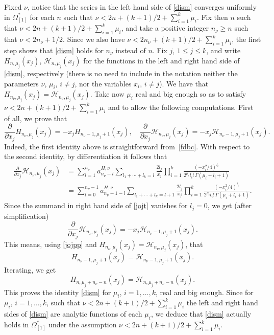 \documentclass[12pt,leqno]{amsart}
\numberwithin{equation}{section}
\theoremstyle{plain}
\newcommand{\Hh}{\mathcal{H}}
\begin{document}
Fixed $\nu$, notice that the series in the left hand side of \eqref{dism} converges uniformly in $\Omega^*_{[1]}$ for each $n$ such that $\nu<2n+(k+1)/2+ \sum_{i=1}^k\mu_i$. Fix then $n$ such that $\nu<2n+(k+1)/2+ \sum_{i=1}^k\mu_i$, and take a positive integer $n_\nu\ge n$ such that $\nu<2n_\nu+1/2$. Since we also have $\nu<2n_\nu+(k+1)/2+ \sum_{i=1}^k\mu_i$, the first step shows that \eqref{dism} holds for $n_\nu$ instead of $n$.
Fix $j$, $1\le j\le k$, and write $H_{n,\mu_j}(x_j)$, $\Hh_{n,\mu_j}(x_j)$ for the functions in the left and right hand side of \eqref{dism}, respectively (there is no need to include in the notation neither the parameters $\nu$, $\mu_i$, $i\not =j$, nor the variables $x_i$, $i\not =j$). We have that $H_{n_\nu,\mu_j}(x_j)=\Hh_{n_\nu,\mu_j}(x_j)$.
Take now $\mu_i$ real and big enough so as to satisfy $\nu<2n+(k+1)/2+ \sum_{i=1}^k\mu_i$ and to allow the following computations. First of all, we prove that
\begin{equation}
\label{jojpp}
\frac{\partial}{\partial x_j}H_{n_\nu,\mu_j}(x_j)
= -x_j H_{n_\nu-1,\mu_j+1}(x_j),
\quad 
\frac{\partial}{\partial x_j}\Hh_{n_\nu,\mu_j}(x_j) 
= -x_j\Hh_{n_\nu-1,\mu_j+1}(x_j).
\end{equation}
Indeed, the first identity above is straightforward from~\eqref{fdbc}. With respect to the second identity, by differentiation it follows that
\begin{align}
\nonumber%
\frac{\partial}{\partial x_j}\Hh_{n_\nu,\mu_j}(x_j)
&= \sum_{l=1}^{n_\nu}a_{n_\nu-l}^{H,\nu} \sum_{l_1+\cdots+l_k=l}
\frac{2l_j}{x_j}
\prod_{i=1}^k \frac{\left(-x_i^2/4\right)^{l_i }}
 {2^{\mu_i}l_i!\, \Gamma(\mu_i + l_i+1)}
\\
\label{jojt}
&= \sum_{l=0}^{n_\nu-1}a_{n_\nu-1-l}^{H,\nu} \sum_{l_1+\cdots+l_k=l+1}
\frac{2l_j}{x_j}
\prod_{i=1}^k \frac{\left(-x_i^2/4\right)^{l_i }}
 {2^{\mu_i}l_i!\, \Gamma(\mu_i + l_i+1)}.
\end{align}
Since the summand in right hand side of \eqref{jojt} vanishes for $l_j=0$,
we get (after simplification)
\[
\frac{\partial}{\partial x_j} \Hh_{n_\nu,\mu_j}(x_j) = -x_j\Hh_{n_\nu-1,\mu_j+1}(x_j).
\]
This means, using \eqref{jojpp} and $H_{n_\nu,\mu_j}(x_j)=\Hh_{n_\nu,\mu_j}(x_j)$, that
\[
H_{n_\nu-1,\mu_j+1}(x_j) = \Hh_{n_\nu-1,\mu_j+1}(x_j).
\]
Iterating, we get
\[
H_{n ,\mu_j+n_\nu-n}(x_j) = \Hh_{n,\mu_j+n_\nu-n}(x_j).
\]
This proves the identity \eqref{dism} for $\mu_i$, $i=1,\dots,k$, real and big enough. Since for $\mu_i$, $i=1,\dots,k$, such that $\nu<2n+(k+1)/2 + \sum_{i=1}^k\mu_i$ the left and right hand sides of \eqref{dism} are analytic functions of each $\mu_i$, we deduce that \eqref{dism} actually holds in $\Omega^*_{[1]}$ under the assumption $\nu<2n+(k+1)/2 + \sum_{i=1}^k\mu_i$.
\end{document}
